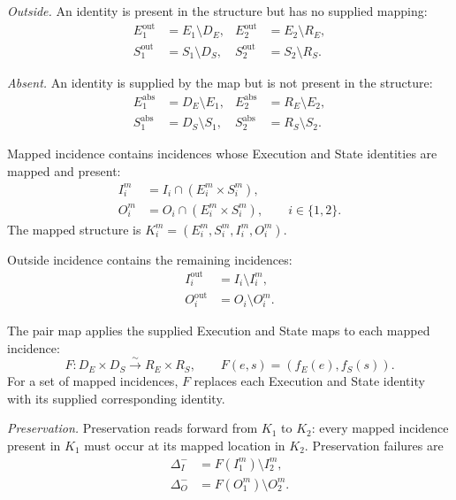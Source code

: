 \documentclass[conference]{IEEEtran}
\theoremstyle{tideproposition}
\begin{document}
\emph{Outside.} An identity is present in the structure but has no supplied mapping:
\begin{align}
E_1^{\mathrm{out}}&=E_1\setminus D_E,
& E_2^{\mathrm{out}}&=E_2\setminus R_E,\\
S_1^{\mathrm{out}}&=S_1\setminus D_S,
& S_2^{\mathrm{out}}&=S_2\setminus R_S.
\label{eq:outside-identities}
\end{align}

\emph{Absent.} An identity is supplied by the map but is not present in the structure:
\begin{align}
E_1^{\mathrm{abs}}&=D_E\setminus E_1,
& E_2^{\mathrm{abs}}&=R_E\setminus E_2,\\
S_1^{\mathrm{abs}}&=D_S\setminus S_1,
& S_2^{\mathrm{abs}}&=R_S\setminus S_2.
\label{eq:absent-identities}
\end{align}

Mapped incidence contains incidences whose Execution and State identities
are mapped and present:
\begin{align}
I_i^m&=I_i\cap(E_i^m\times S_i^m),\\
O_i^m&=O_i\cap(E_i^m\times S_i^m),\qquad i\in\{1,2\}.
\label{eq:mapped-incidence}
\end{align}
The mapped structure is $K_i^m=(E_i^m,S_i^m,I_i^m,O_i^m)$.

Outside incidence contains the remaining incidences:
\begin{align}
I_i^{\mathrm{out}}&=I_i\setminus I_i^m,\\
O_i^{\mathrm{out}}&=O_i\setminus O_i^m.
\label{eq:outside-incidence}
\end{align}

The pair map applies the supplied Execution and State maps to each mapped incidence:
\begin{equation}
F:D_E\times D_S\overset{\sim}{\longrightarrow}R_E\times R_S,
\qquad
F(e,s)=(f_E(e),f_S(s)).
\end{equation}
For a set of mapped incidences, $F$ replaces each Execution and State identity with its supplied corresponding identity.

\emph{Preservation.}
Preservation reads forward from $K_1$ to $K_2$: every mapped incidence present in $K_1$ must occur at its mapped location in $K_2$. Preservation failures are
\begin{align}
\Delta_I^-&=F(I_1^m)\setminus I_2^m,\\
\Delta_O^-&=F(O_1^m)\setminus O_2^m.
\label{eq:preservation-deltas}
\end{align}
\end{document}
